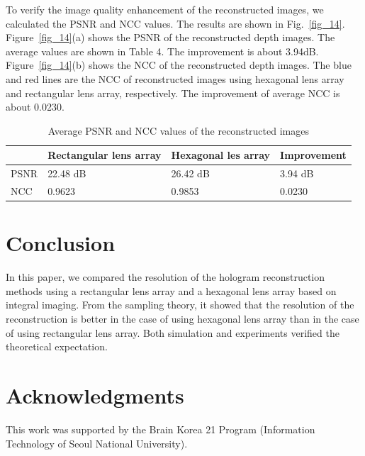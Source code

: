 \documentclass[10pt,letterpaper]{article}
\begin{document}
To verify the image quality enhancement of the reconstructed images, we calculated the PSNR and NCC values. The results are shown in Fig.~\ref{fig_14}. Figure~\ref{fig_14}(a) shows the PSNR of the reconstructed depth images. The average values are shown in Table 4. The improvement is about 3.94dB. Figure~\ref{fig_14}(b) shows the NCC of the reconstructed depth images. The blue and red lines are the NCC of reconstructed images using hexagonal lens array and rectangular lens array, respectively. The improvement of average NCC is about 0.0230. 
\begin{table}[htbp]
\centering\caption{Average PSNR and NCC values of the reconstructed images}
\begin{tabular}{p{0.4in}|p{1.3in}|p{1.1in}|p{0.7in}} \hline 
 & Rectangular lens array & Hexagonal les array & Improvement \\ \hline 
PSNR & 22.48 dB & 26.42 dB & 3.94 dB \\ \hline 
NCC & 0.9623 & 0.9853 & 0.0230 \\ \hline 
\end{tabular}
\label{tb_4}
\end{table}

\section{Conclusion}
In this paper, we compared the resolution of the hologram reconstruction methods using a rectangular lens array and a hexagonal lens array based on integral imaging. From the sampling theory, it showed that the resolution of the reconstruction is better in the case of using hexagonal lens array than in the case of using rectangular lens array. Both simulation and experiments verified the theoretical expectation.

\section*{Acknowledgments} 
This work was supported by the Brain Korea 21 Program (Information Technology of Seoul National University).
\end{document}

